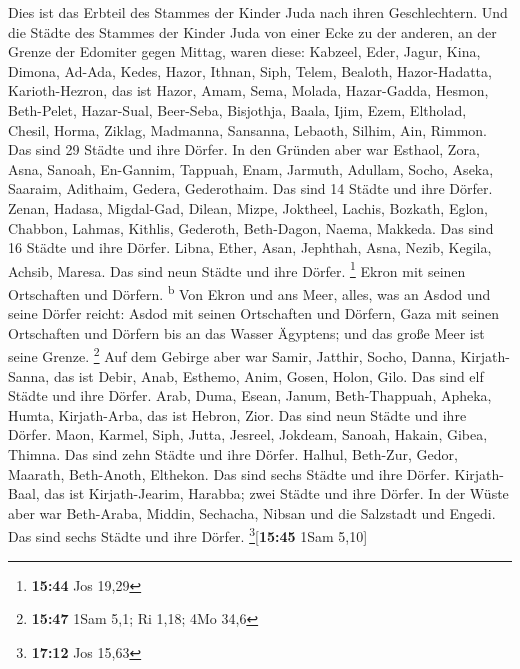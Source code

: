  Dies ist das Erbteil des Stammes der Kinder Juda nach
ihren Geschlechtern.  Und die Städte des Stammes der
Kinder Juda von einer Ecke zu der anderen, an der Grenze der Edomiter
gegen Mittag, waren diese: Kabzeel, Eder, Jagur,  Kina,
Dimona, Ad-Ada,  Kedes, Hazor, Ithnan, 
Siph, Telem, Bealoth,  Hazor-Hadatta, Karioth-Hezron, das
ist Hazor,  Amam, Sema, Molada, 
Hazar-Gadda, Hesmon, Beth-Pelet,  Hazar-Sual, Beer-Seba,
Bisjothja,  Baala, Ijim, Ezem,  Eltholad,
Chesil, Horma,  Ziklag, Madmanna, Sansanna,
 Lebaoth, Silhim, Ain, Rimmon. Das sind 29 Städte und
ihre Dörfer.  In den Gründen aber war Esthaol, Zora,
Asna,  Sanoah, En-Gannim, Tappuah, Enam, 
Jarmuth, Adullam, Socho, Aseka,  Saaraim, Adithaim,
Gedera, Gederothaim. Das sind 14 Städte und ihre Dörfer. 
Zenan, Hadasa, Migdal-Gad,  Dilean, Mizpe, Joktheel,
 Lachis, Bozkath, Eglon,  Chabbon, Lahmas,
Kithlis,  Gederoth, Beth-Dagon, Naema, Makkeda. Das sind
16 Städte und ihre Dörfer.  Libna, Ether, Asan,
 Jephthah, Asna, Nezib,  Kegila, Achsib,
Maresa. Das sind neun Städte und ihre Dörfer. \footnote{\textbf{15:44}
  Jos 19,29}  Ekron mit seinen Ortschaften und Dörfern.
\textsuperscript{b}  Von Ekron und ans Meer, alles, was
an Asdod und seine Dörfer reicht:  Asdod mit seinen
Ortschaften und Dörfern, Gaza mit seinen Ortschaften und Dörfern bis an
das Wasser Ägyptens; und das große Meer ist seine Grenze. \footnote{\textbf{15:47}
  1Sam 5,1; Ri 1,18; 4Mo 34,6}  Auf dem Gebirge aber war
Samir, Jatthir, Socho,  Danna, Kirjath-Sanna, das ist
Debir,  Anab, Esthemo, Anim,  Gosen,
Holon, Gilo. Das sind elf Städte und ihre Dörfer.  Arab,
Duma, Esean,  Janum, Beth-Thappuah, Apheka,
 Humta, Kirjath-Arba, das ist Hebron, Zior. Das sind neun
Städte und ihre Dörfer.  Maon, Karmel, Siph, Jutta,
 Jesreel, Jokdeam, Sanoah,  Hakain, Gibea,
Thimna. Das sind zehn Städte und ihre Dörfer.  Halhul,
Beth-Zur, Gedor,  Maarath, Beth-Anoth, Elthekon. Das sind
sechs Städte und ihre Dörfer.  Kirjath-Baal, das ist
Kirjath-Jearim, Harabba; zwei Städte und ihre Dörfer.  In
der Wüste aber war Beth-Araba, Middin, Sechacha,  Nibsan
und die Salzstadt und Engedi. Das sind sechs Städte und ihre Dörfer.
\footnote{\textbf{17:12} Jos 15,63}{[}\textbf{15:45} 1Sam 5,10{]}


